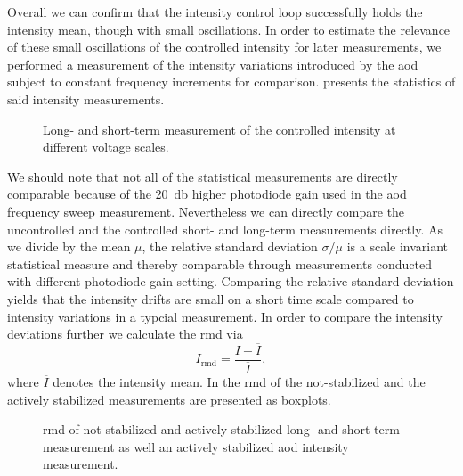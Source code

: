Overall we can confirm that the intensity control loop successfully holds the
intensity mean, though with small oscillations. In order to estimate the
relevance of these small oscillations of the controlled intensity for later
measurements, we performed a measurement of the intensity variations introduced
by the \gls{aod} subject to constant frequency increments for comparison.
 presents the statistics of said
intensity measurements.
\begin{figure}[htb]
  \centering
  \begin{adjustbox}{width=\textwidth}
    
  \end{adjustbox}
  \caption{Long- and short-term measurement of the controlled intensity at
    different voltage scales.
  }\label{fig:intensity_control}
\end{figure}
We should note that not all of the statistical measurements are directly
comparable because of the \SI{20}{\decibel} higher photodiode gain used in
the \gls{aod} frequency sweep measurement. Nevertheless we can directly compare
the uncontrolled and the controlled short- and long-term measurements
directly. As we divide by the mean $\mu$, the relative standard deviation
$\sigma/\mu$ is a scale invariant statistical measure and thereby comparable
through measurements conducted with different photodiode gain setting.
Comparing the relative standard deviation yields that the intensity drifts
are small on a short time scale compared to intensity variations in a typcial
measurement. In order to compare the intensity deviations further we calculate
the \gls{rmd} via
\begin{equation}
  I_\text{rmd}
  =
  \frac{I-\overline{I}}{\overline{I}}
  \label{eq:relative_mean_deviation},
\end{equation}
where $\overline{I}$ denotes the intensity mean. In
 the \gls{rmd} of the not-stabilized and
the actively stabilized measurements are presented as boxplots.
\begin{figure}[htb]
  \centering
  \begin{adjustbox}{width=\textwidth}
    
  \end{adjustbox}
  \caption{\gls{rmd} of not-stabilized and actively stabilized long- and
    short-term measurement as well an actively stabilized \gls{aod}
    intensity measurement.
  }\label{fig:intensity_control_rmd}
\end{figure}
